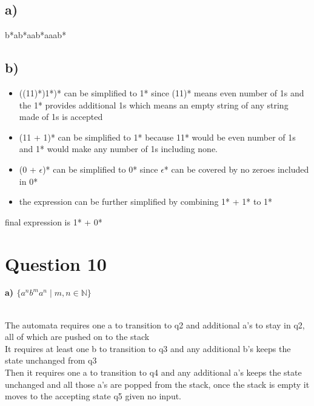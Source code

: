 \documentclass[11pt]{article}
\begin{document}
\subsection*{a)}
b*ab*aab*aaab*

\subsection*{b)}
\begin{itemize}
    \item ((11)*)1*)* can be simplified to 1* since (11)* means even number of
          1s and the 1* provides additional 1s which means an empty string
          of any string made of 1s is accepted
    \item (11 + 1)* can be simplified to 1* because 11* would be even number of
        1s and 1* would make any number of 1s including none.
    \item (0 + $\epsilon$)* can be simplified to 0* since $\epsilon$* can be
        covered by no zeroes included in 0*
    \item the expression can be further simplified by combining 1* + 1* to 1*
\end{itemize}
final expression is 1* + 0*

\section*{Question 10}
\textbf{a) $\{a^nb^ma^n \;|\; m, n \in \mathbb{N}\}$} \\

\\
The automata requires one a to transition to q2 and additional a's to stay in q2, all of which are pushed on to the stack \\
It requires at least one b to transition to q3 and any additional b's keeps the state unchanged from q3 \\
Then it requires one a to transition to q4 and any additional a's keeps the state
unchanged and all those a's are popped from the stack,
once the stack is empty it moves to the accepting state q5 given no input.\\
\end{document}
